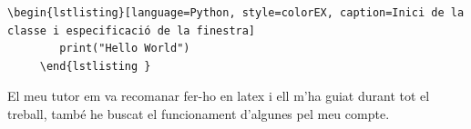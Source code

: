 \begin{lstlisting}[style=latex, caption={Exemple de codi Hello world mostrat amb el paquet listings}, label={lst:prova-hello}]
    \begin{lstlisting}[language=Python, style=colorEX, caption=Inici de la classe i especificació de la finestra]
        print("Hello World")
     \end{lstlisting }
\end{lstlisting}

El meu tutor em va recomanar fer-ho en latex i ell m'ha guiat durant tot el treball, també he buscat el funcionament d'algunes pel meu compte. \cite{learnlatex2023} \cite{RubiksCubeTikz} \cite{HeaderambFancy}  
